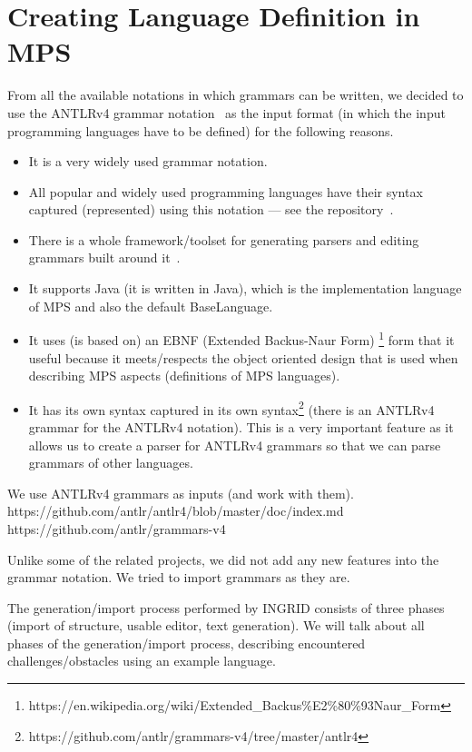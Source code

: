 \section{Creating Language Definition in MPS}
\label{sect:LANGDEF}

From all the available notations in which grammars can be written, we decided to use the ANTLRv4 grammar notation~\cite{ANTLR4reference} as the input format (in which the input programming languages have to be defined) for the following reasons.
\begin{itemize}
	\item It is a very widely used grammar notation.
	\item All popular and widely used programming languages have their syntax captured (represented) using this notation --- see the repository~\cite{ref:ANTLR4grammars}.
	\item There is a whole framework/toolset for generating parsers and editing grammars built around it~\cite{ref:ANTLR4}.
	\item It supports Java (it is written in Java), which is the implementation language of MPS and also the default BaseLanguage.
	\item It uses (is based on) an EBNF (Extended Backus-Naur Form) \footnote{https://en.wikipedia.org/wiki/Extended{\_}Backus\%E2\%80\%93Naur{\_}Form} form that it useful because it meets/respects the object oriented design that is used when describing MPS aspects (definitions of MPS languages).
	\item It has its own syntax captured in its own syntax\footnote{https://github.com/antlr/grammars-v4/tree/master/antlr4} (there is an ANTLRv4 grammar for the ANTLRv4 notation). This is a very important feature as it allows us to create a parser for ANTLRv4 grammars so that we can parse grammars of other languages.
\end{itemize}

We use ANTLRv4 grammars as inputs (and work with them).
	https://github.com/antlr/antlr4/blob/master/doc/index.md
	https://github.com/antlr/grammars-v4

Unlike some of the related projects, we did not add any new features into the grammar notation.
We tried to import grammars as they are.

The generation/import process performed by INGRID consists of three phases (import of structure, usable editor, text generation).
We will talk about all phases of the generation/import process, describing encountered challenges/obstacles using an example language.

